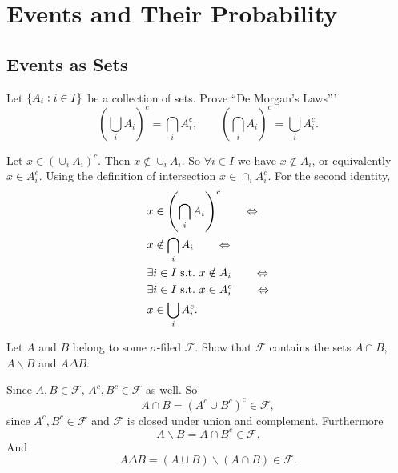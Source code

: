 \chapter{Events and Their Probability}



\section{Events as Sets}

\begin{problem}
	Let $ \{A_i: i\in I\} $ be a collection of sets. Prove ``De Morgan's Laws'''
	\[ \left( \bigcup_i A_i \right)^c = \bigcap_i A_i^c, \qquad \left( \bigcap_i A_i \right)^c = \bigcup_i A_i^c. \]
\end{problem}

\begin{solution}
	Let $ x \in  \left( \cup_i A_i \right)^c $. Then $ x\notin \cup_i A_i $. So $ \forall i \in I $ we have $ x\notin A_i $, or equivalently $ x\in A_i^c $. Using the definition of intersection $ x\in \cap_i A_i^c $. For the second identity,
	\begin{align*}
		& x \in  \left( \bigcap_i A_i \right)^c \qquad \Leftrightarrow \\
		& x \notin \bigcap_i A_i \qquad \Leftrightarrow \\
		& \exists i\in I \ \text{s.t.}\  x \notin A_i \qquad \Leftrightarrow \\
		& \exists i\in I \ \text{s.t.}\  x \in A_i^c  \qquad \Leftrightarrow \\
		& x \in \bigcup_i A_i^c.
	\end{align*}
\end{solution}


\begin{problem}
	Let $ A $ and $ B $ belong to some $ \sigma $-filed $ \mathcal{F} $. Show that $ \mathcal{F} $ contains the sets $ A\cap B $, $ A\backslash B $ and $ A\Delta B $.
\end{problem}
\begin{solution}
	Since $ A,B \in\mathcal{F} $, $ A^c, B^c \in \mathcal{F} $ as well. So
	\[ A\cap B = (A^c \cup B^c)^c \in \mathcal{F}, \]
	since $ A^c, B^c \in \mathcal{F} $ and $ \mathcal{F} $ is closed under union and complement. Furthermore
	\[ A\backslash B = A\cap B^c \in \mathcal{F}. \]
	And
	\[ A\Delta B = (A\cup B) \backslash (A\cap B)  \in \mathcal{F}. \]
\end{solution}


